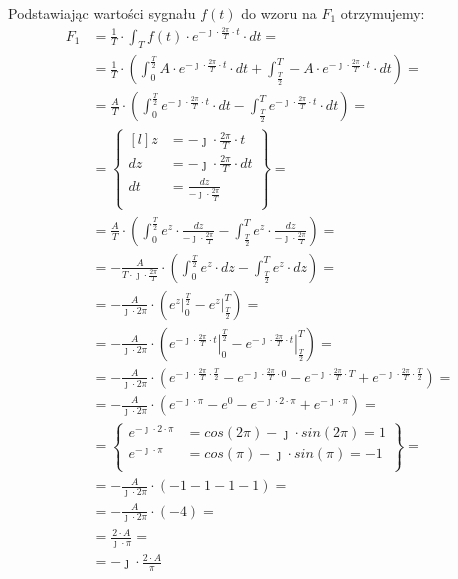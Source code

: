\begin{task}
Podstawiając wartości sygnału $f(t)$ do wzoru na $F_1$ otrzymujemy:
\begin{align*}
F_1&=\frac{1}{T} \cdot \int_{T}f(t) \cdot e^{-\jmath \cdot \frac{2\pi}{T} \cdot t} \cdot dt=\\
&=\frac{1}{T} \cdot \left(\int_{0}^{\frac{T}{2}}A \cdot e^{-\jmath \cdot \frac{2\pi}{T} \cdot t} \cdot dt + \int_{\frac{T}{2}}^{T}-A \cdot e^{-\jmath \cdot \frac{2\pi}{T} \cdot t} \cdot dt\right)=\\
&=\frac{A}{T} \cdot \left(\int_{0}^{\frac{T}{2}}e^{-\jmath \cdot \frac{2\pi}{T} \cdot t} \cdot dt - \int_{\frac{T}{2}}^{T}e^{-\jmath \cdot \frac{2\pi}{T} \cdot t} \cdot dt\right)=\\
&=\begin{Bmatrix*}[l]
z&=-\jmath \cdot \frac{2\pi}{T} \cdot t\\
dz&=-\jmath \cdot \frac{2\pi}{T} \cdot dt\\
dt&=\frac{dz}{-\jmath \cdot \frac{2\pi}{T}}\\
\end{Bmatrix*}=\\
&=\frac{A}{T} \cdot \left(\int_{0}^{\frac{T}{2}} e^{z} \cdot \frac{dz}{-\jmath \cdot \frac{2\pi}{T}}-\int_{\frac{T}{2}}^{T} e^{z} \cdot \frac{dz}{-\jmath \cdot \frac{2\pi}{T}}\right)=\\
&=-\frac{A}{T \cdot \jmath \cdot \frac{2\pi}{T}} \cdot \left(\int_{0}^{\frac{T}{2}} e^{z} \cdot dz - \int_{\frac{T}{2}}^{T} e^{z} \cdot dz\right)=\\
&=-\frac{A}{\jmath \cdot 2 \pi} \cdot \left(\left. e^{z} \right|_{0}^{\frac{T}{2}} - \left. e^{z} \right|_{\frac{T}{2}}^{T}\right)=\\
&=-\frac{A}{\jmath \cdot 2 \pi} \cdot \left(\left. e^{-\jmath \cdot \frac{2\pi}{T} \cdot t} \right|_{0}^{\frac{T}{2}} - \left. e^{-\jmath \cdot \frac{2\pi}{T} \cdot t} \right|_{\frac{T}{2}}^{T}\right)=\\
&=-\frac{A}{\jmath \cdot 2 \pi} \cdot \left( e^{-\jmath \cdot \frac{2\pi}{T} \cdot \frac{T}{2}} - e^{-\jmath \cdot \frac{2\pi}{T} \cdot 0} -e^{-\jmath \cdot \frac{2\pi}{T} \cdot T} + e^{-\jmath \cdot \frac{2\pi}{T} \cdot \frac{T}{2}}\right)=\\
&=-\frac{A}{\jmath \cdot 2 \pi} \cdot \left( e^{ -\jmath \cdot \pi } - e^{ 0} - e^{ -\jmath \cdot 2 \cdot \pi}+e^{ -\jmath \cdot \pi }\right)=\\
&=\begin{Bmatrix}
e^{ -\jmath \cdot 2\cdot \pi }&=cos(2\pi)-\jmath \cdot sin(2\pi)=1\\
e^{ -\jmath \cdot \pi }&=cos(\pi)-\jmath \cdot sin(\pi)=-1\\
\end{Bmatrix}=\\
&=-\frac{A}{\jmath \cdot 2 \pi} \cdot \left( -1 - 1 - 1 -1\right)=\\
&=-\frac{A}{\jmath \cdot 2 \pi} \cdot \left( -4\right)=\\
&=\frac{2 \cdot A}{\jmath \cdot \pi}=\\
&=-\jmath \cdot \frac{2 \cdot A}{\pi}
\end{align*}


\end{task}
